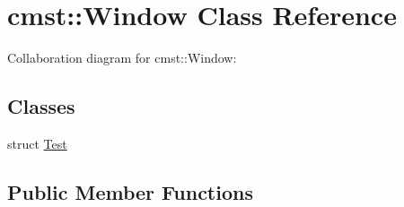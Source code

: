 \hypertarget{classcmst_1_1_window}{}\section{cmst\+:\+:Window Class Reference}
\label{classcmst_1_1_window}


Collaboration diagram for cmst\+:\+:Window\+:
\subsection*{Classes}
\begin{DoxyCompactItemize}
\item 
struct \hyperlink{structcmst_1_1_window_1_1_test}{Test}
\end{DoxyCompactItemize}
\subsection*{Public Member Functions}
